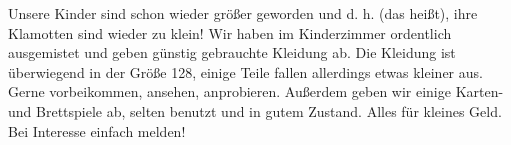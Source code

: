 

Unsere Kinder sind schon wieder größer geworden und d. h. (das heißt), ihre Klamotten sind wieder zu klein!
Wir haben im Kinderzimmer ordentlich ausgemistet und geben günstig gebrauchte Kleidung ab. Die Kleidung ist überwiegend in der Größe 128, einige Teile fallen allerdings etwas kleiner aus. Gerne vorbeikommen, ansehen, anprobieren. Außerdem geben wir einige Karten- und Brettspiele ab, selten benutzt und in gutem Zustand. Alles für kleines Geld. Bei Interesse einfach melden!